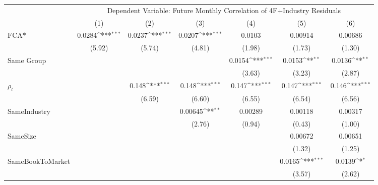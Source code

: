 {
\def\sym#1{\ifmmode^{#1}\else\(^{#1}\)\fi}
\begin{tabular}{l*{6}{c}}
\hline\hline
                &\multicolumn{6}{c}{Dependent Variable: Future Monthly Correlation of 4F+Industry Residuals}                      \\\cmidrule(lr){2-7}
                &\multicolumn{1}{c}{(1)}         &\multicolumn{1}{c}{(2)}         &\multicolumn{1}{c}{(3)}         &\multicolumn{1}{c}{(4)}         &\multicolumn{1}{c}{(5)}         &\multicolumn{1}{c}{(6)}         \\
\hline
$ \text{FCA*} $ &   0.0284\sym{***}&   0.0237\sym{***}&   0.0207\sym{***}&   0.0103         &  0.00914         &  0.00686         \\
                &   (5.92)         &   (5.74)         &   (4.81)         &   (1.98)         &   (1.73)         &   (1.30)         \\
[1em]
Same Group      &                  &                  &                  &   0.0154\sym{***}&   0.0153\sym{**} &   0.0136\sym{**} \\
                &                  &                  &                  &   (3.63)         &   (3.23)         &   (2.87)         \\
[1em]
 $ {\rho_t} $   &                  &    0.148\sym{***}&    0.148\sym{***}&    0.147\sym{***}&    0.147\sym{***}&    0.146\sym{***}\\
                &                  &   (6.59)         &   (6.60)         &   (6.55)         &   (6.54)         &   (6.56)         \\
[1em]
SameIndustry    &                  &                  &  0.00645\sym{**} &  0.00289         &  0.00118         &  0.00317         \\
                &                  &                  &   (2.76)         &   (0.94)         &   (0.43)         &   (1.00)         \\
[1em]
SameSize        &                  &                  &                  &                  &  0.00672         &  0.00651         \\
                &                  &                  &                  &                  &   (1.32)         &   (1.25)         \\
[1em]
SameBookToMarket&                  &                  &                  &                  &   0.0165\sym{***}&   0.0139\sym{*}  \\
                &                  &                  &                  &                  &   (3.57)         &   (2.62)         \\

\end{tabular}}
